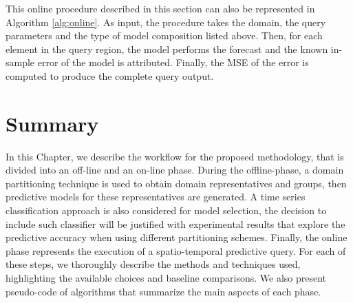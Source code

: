 This online procedure described in this section can also be represented in Algorithm \ref{alg:online}. As input, the procedure takes the domain, the query parameters and the type of model composition listed above. Then, for each element in the query region, the model performs the forecast and the known in-sample error of the model is attributed. Finally, the MSE of the error is computed to produce the complete query output.

\section{Summary}
\label{Sec:MethodologySummary}

In this Chapter, we describe the workflow for the proposed methodology, that is divided into an off-line and an on-line phase. During the offline-phase, a domain partitioning technique is used to obtain domain representatives and groups, then predictive models for these representatives are generated. A time series classification approach is also considered for model selection, the decision to include such classifier will be justified with experimental results that explore the predictive accuracy when using different partitioning schemes. Finally, the online phase represents the execution of a spatio-temporal predictive query. For each of these steps, we thoroughly describe the methods and techniques used, highlighting the available choices and baseline comparisons. We also present pseudo-code of algorithms that summarize the main aspects of each phase.